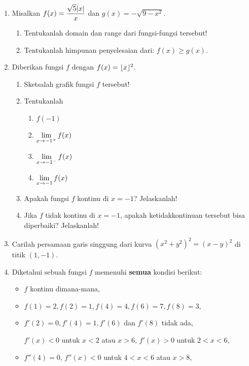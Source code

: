 \begin{enumerate}[leftmargin=*, label={\arabic*}.]
\item Misalkan $\displaystyle f(x) = \frac{\sqrt{5}\lvert x\rvert}{x}$ dan $g(x) = -\sqrt{9-x^{2}}$.
\begin{enumerate}[label={\alph*}.]
    \item Tentukanlah domain dan range dari fungsi-fungsi tersebut!
    \item Tentukanlah himpunan penyelesaian dari: $f(x) \geq g(x)$.
\end{enumerate}
\item Diberikan fungsi $f$ dengan $f(x) = \lfloor x\rfloor^2$.
\begin{enumerate}[label={\alph*}.]
    \item Sketsalah grafik fungsi $f$ tersebut!
    \item Tentukanlah
    \begin{enumerate}[label={\roman*}.]
        \item $f(-1)$
        \item $\displaystyle\lim_{x\to -1^{+}} f(x)$
        \item $\displaystyle\lim_{x\to -1^{-}} f(x)$
        \item $\displaystyle\lim_{x\to -1} f(x)$
    \end{enumerate}
    \item Apakah fungsi $f$ kontinu di $x=-1$? Jelaskanlah!
    \item Jika $f$ tidak kontinu di $x=-1$, apakah ketidakkontinuan tersebut bisa 
    diperbaiki? Jelaskanlah!
\end{enumerate}
\item Carilah persamaan garis singgung dari kurva $(x^2+y^2)^2=(x-y)^2$ di titik $(1,-1)$.
\item Diketahui sebuah fungsi $f$ memenuhi \textbf{semua} kondisi berikut:
\begin{itemize}
    \item $f$ kontinu dimana-mana,
    \item $f(1)=2,f(2)=1,f(4)=4,f(6)=7,f(8)=3$,
    \item $f'(2)=0,f'(4)=1,f'(6)$ dan $f'(8)$ tidak ada,
    
    $f'(x)<0$ untuk $x < 2$ atau $x>6$, $f'(x)>0$ untuk $2<x<6$,
    \item $f''(4) = 0$, $f''(x)<0$ untuk $4<x<6$ atau $x > 8$,
    

\end{itemize}
\end{enumerate}
